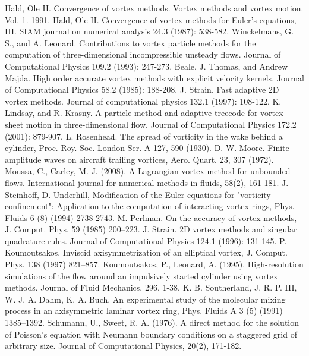 \documentclass[letterpaper,12pt]{report}
\begin{document}
\begin{thebibliography}{9}
Hald, Ole H. Convergence of vortex methods. Vortex methods and vortex motion. Vol. 1. 1991.
Hald, Ole H. Convergence of vortex methods for Euler's equations, III. SIAM journal on numerical analysis 24.3 (1987): 538-582.
Winckelmans, G. S., and A. Leonard. Contributions to vortex particle methods for the computation of three-dimensional incompressible unsteady flows. Journal of Computational Physics 109.2 (1993): 247-273.
Beale, J. Thomas, and Andrew Majda. High order accurate vortex methods with explicit velocity kernels. Journal of Computational Physics 58.2 (1985): 188-208.
J. Strain. Fast adaptive 2D vortex methods. Journal of computational physics 132.1 (1997): 108-122.
K. Lindsay, and R. Krasny. A particle method and adaptive treecode for vortex sheet motion in three-dimensional flow. Journal of Computational Physics 172.2 (2001): 879-907.
L. Rosenhead. The spread of vorticity in the wake behind a cylinder, Proc. Roy. Soc. London Ser. A 127, 590 (1930).
D. W. Moore. Finite amplitude waves on aircraft trailing vortices, Aero. Quart. 23, 307 (1972).
Moussa, C., Carley, M. J. (2008). A Lagrangian vortex method for unbounded flows. International journal for numerical methods in fluids, 58(2), 161-181.
J. Steinhoff, D. Underhill, Modification of the Euler equations for "vorticity confinement": Application to the computation of interacting vortex rings, Phys. Fluids 6 (8) (1994) 2738-2743.
M. Perlman. On the accuracy of vortex methods, J. Comput. Phys. 59 (1985) 200–223.
J. Strain. 2D vortex methods and singular quadrature rules. Journal of Computational Physics 124.1 (1996): 131-145.
P. Koumoutsakos. Inviscid axisymmetrization of an elliptical vortex, J. Comput. Phys. 138 (1997) 821–857.
Koumoutsakos, P., Leonard, A. (1995). High-resolution simulations of the flow around an impulsively started cylinder using vortex methods. Journal of Fluid Mechanics, 296, 1-38.
K. B. Southerland, J. R. P. III, W. J. A. Dahm, K. A. Buch. An experimental study of the molecular mixing process in an axisymmetric laminar vortex ring, Phys. Fluids A 3 (5) (1991) 1385–1392.
Schumann, U., Sweet, R. A. (1976). A direct method for the solution of Poisson's equation with Neumann boundary conditions on a staggered grid of arbitrary size. Journal of Computational Physics, 20(2), 171-182.

\end{thebibliography}
\end{document}
